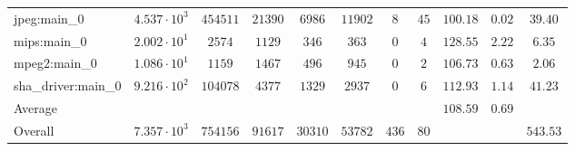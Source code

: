 \begin{tabular}{|l|c|c|c|c|c|c|c|c|c|c|}
jpeg:main\_0            & $ 4.537 \cdot 10^{3}  $ & $ 454511 $ & $ 21390 $ & $ 6986  $ & $ 11902 $ & $ 8   $ & $ 45 $ & $ 100.18      $ & $ 0.02    $ & $ 39.40   $ \\
mips:main\_0            & $ 2.002 \cdot 10^{1}  $ & $ 2574   $ & $ 1129  $ & $ 346   $ & $ 363   $ & $ 0   $ & $ 4  $ & $ 128.55      $ & $ 2.22    $ & $ 6.35    $ \\
mpeg2:main\_0           & $ 1.086 \cdot 10^{1}  $ & $ 1159   $ & $ 1467  $ & $ 496   $ & $ 945   $ & $ 0   $ & $ 2  $ & $ 106.73      $ & $ 0.63    $ & $ 2.06    $ \\
sha\_driver:main\_0     & $ 9.216 \cdot 10^{2}  $ & $ 104078 $ & $ 4377  $ & $ 1329  $ & $ 2937  $ & $ 0   $ & $ 6  $ & $ 112.93      $ & $ 1.14    $ & $ 41.23   $ \\
\hline
Average                 & $                     $ & $        $ & $       $ & $       $ & $       $ & $     $ & $    $ & $ 108.59      $ & $ 0.69    $ & $         $ \\
\hline
Overall                 & $ 7.357 \cdot 10^{3}  $ & $ 754156 $ & $ 91617 $ & $ 30310 $ & $ 53782 $ & $ 436 $ & $ 80 $ & $             $ & $         $ & $ 543.53  $ \\
\hline
\end{tabular}
